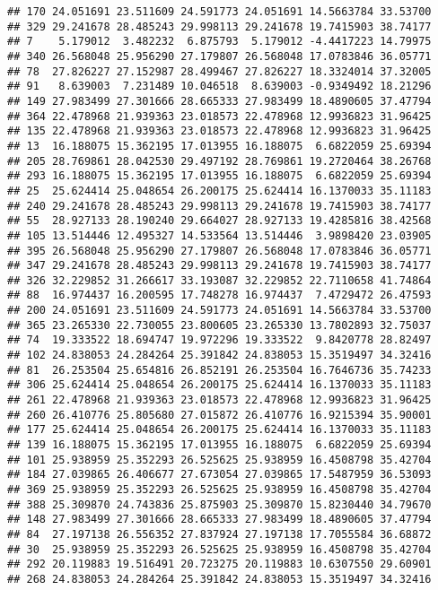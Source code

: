 \documentclass[
]{article}
\begin{document}
\begin{verbatim}
## 170 24.051691 23.511609 24.591773 24.051691 14.5663784 33.53700
## 329 29.241678 28.485243 29.998113 29.241678 19.7415903 38.74177
## 7    5.179012  3.482232  6.875793  5.179012 -4.4417223 14.79975
## 340 26.568048 25.956290 27.179807 26.568048 17.0783846 36.05771
## 78  27.826227 27.152987 28.499467 27.826227 18.3324014 37.32005
## 91   8.639003  7.231489 10.046518  8.639003 -0.9349492 18.21296
## 149 27.983499 27.301666 28.665333 27.983499 18.4890605 37.47794
## 364 22.478968 21.939363 23.018573 22.478968 12.9936823 31.96425
## 135 22.478968 21.939363 23.018573 22.478968 12.9936823 31.96425
## 13  16.188075 15.362195 17.013955 16.188075  6.6822059 25.69394
## 205 28.769861 28.042530 29.497192 28.769861 19.2720464 38.26768
## 293 16.188075 15.362195 17.013955 16.188075  6.6822059 25.69394
## 25  25.624414 25.048654 26.200175 25.624414 16.1370033 35.11183
## 240 29.241678 28.485243 29.998113 29.241678 19.7415903 38.74177
## 55  28.927133 28.190240 29.664027 28.927133 19.4285816 38.42568
## 105 13.514446 12.495327 14.533564 13.514446  3.9898420 23.03905
## 395 26.568048 25.956290 27.179807 26.568048 17.0783846 36.05771
## 347 29.241678 28.485243 29.998113 29.241678 19.7415903 38.74177
## 326 32.229852 31.266617 33.193087 32.229852 22.7110658 41.74864
## 88  16.974437 16.200595 17.748278 16.974437  7.4729472 26.47593
## 200 24.051691 23.511609 24.591773 24.051691 14.5663784 33.53700
## 365 23.265330 22.730055 23.800605 23.265330 13.7802893 32.75037
## 74  19.333522 18.694747 19.972296 19.333522  9.8420778 28.82497
## 102 24.838053 24.284264 25.391842 24.838053 15.3519497 34.32416
## 81  26.253504 25.654816 26.852191 26.253504 16.7646736 35.74233
## 306 25.624414 25.048654 26.200175 25.624414 16.1370033 35.11183
## 261 22.478968 21.939363 23.018573 22.478968 12.9936823 31.96425
## 260 26.410776 25.805680 27.015872 26.410776 16.9215394 35.90001
## 177 25.624414 25.048654 26.200175 25.624414 16.1370033 35.11183
## 139 16.188075 15.362195 17.013955 16.188075  6.6822059 25.69394
## 101 25.938959 25.352293 26.525625 25.938959 16.4508798 35.42704
## 184 27.039865 26.406677 27.673054 27.039865 17.5487959 36.53093
## 369 25.938959 25.352293 26.525625 25.938959 16.4508798 35.42704
## 388 25.309870 24.743836 25.875903 25.309870 15.8230440 34.79670
## 148 27.983499 27.301666 28.665333 27.983499 18.4890605 37.47794
## 84  27.197138 26.556352 27.837924 27.197138 17.7055584 36.68872
## 30  25.938959 25.352293 26.525625 25.938959 16.4508798 35.42704
## 292 20.119883 19.516491 20.723275 20.119883 10.6307550 29.60901
## 268 24.838053 24.284264 25.391842 24.838053 15.3519497 34.32416

\end{verbatim}
\end{document}
